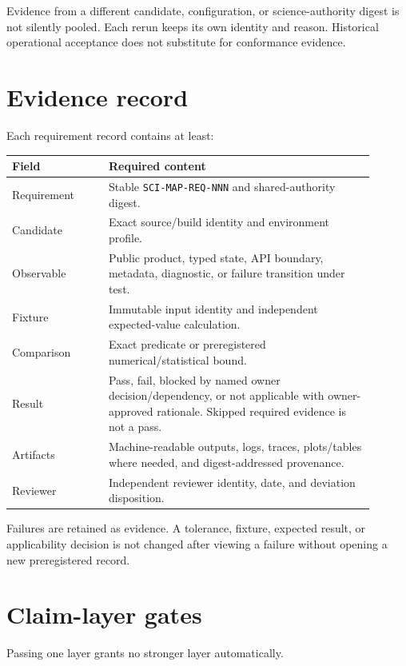 \documentclass[10pt]{article}
\begin{document}
Evidence from a different candidate, configuration, or science-authority
digest is not silently pooled. Each rerun keeps its own identity and reason.
Historical operational acceptance does not substitute for conformance
evidence.

\section{Evidence record}

Each requirement record contains at least:

\begin{longtable}{L{0.24\linewidth}L{0.66\linewidth}}
\toprule
Field & Required content\\
\midrule
Requirement & Stable \texttt{SCI-MAP-REQ-NNN} and shared-authority digest.\\
Candidate & Exact source/build identity and environment profile.\\
Observable & Public product, typed state, API boundary, metadata, diagnostic,
or failure transition under test.\\
Fixture & Immutable input identity and independent expected-value calculation.\\
Comparison & Exact predicate or preregistered numerical/statistical bound.\\
Result & Pass, fail, blocked by named owner decision/dependency, or not
applicable with owner-approved rationale. Skipped required evidence is not a
pass.\\
Artifacts & Machine-readable outputs, logs, traces, plots/tables where needed,
and digest-addressed provenance.\\
Reviewer & Independent reviewer identity, date, and deviation disposition.\\
\bottomrule
\end{longtable}

Failures are retained as evidence. A tolerance, fixture, expected result, or
applicability decision is not changed after viewing a failure without opening
a new preregistered record.

\clearpage
\section{Claim-layer gates}

Passing one layer grants no stronger layer automatically.
\end{document}
